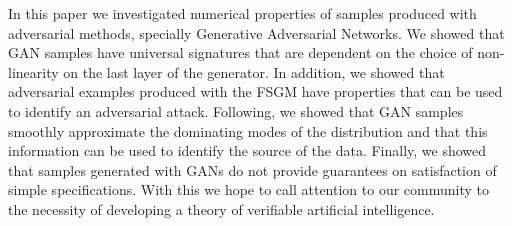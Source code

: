 In this paper we investigated numerical properties of samples produced 
with adversarial methods, specially Generative Adversarial Networks. We showed that GAN samples have universal signatures that are dependent on the choice of non-linearity on the last layer of the generator. In addition, we showed that adversarial examples produced with the FSGM have properties that can be used to identify an adversarial attack. Following, we showed that GAN samples smoothly approximate the dominating modes of the distribution and that this information can be used to identify the source of the data. Finally, we showed that samples generated with GANs do not provide guarantees on satisfaction of simple specifications. With this we hope to call attention to our community to the necessity of developing a theory of verifiable artificial intelligence.
